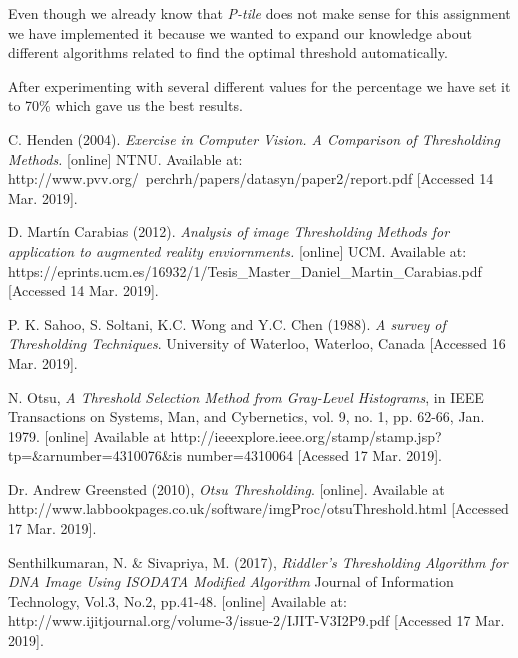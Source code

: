 \documentclass[12]{article}
\begin{document}
Even though we already know that \textit{P-tile} does not make sense for this assignment we have implemented it because we wanted to expand our knowledge about different algorithms related to find the optimal threshold automatically. 

After experimenting with several different values for the percentage we have set it to 70\% which gave us the best results. 


\begin{thebibliography}{100}

C. Henden (2004). \textit{ Exercise in Computer Vision. A Comparison of Thresholding Methods.} [online] NTNU. Available at: http://www.pvv.org/~perchrh/papers/datasyn/paper2/report.pdf [Accessed 14 Mar. 2019].


D. Martín Carabias (2012). \textit{Analysis of image Thresholding Methods for application to augmented reality enviornments.} [online] UCM. Available at: https://eprints.ucm.es/16932/1/Tesis\_Master\_Daniel\_Martin\_Carabias.pdf [Accessed 14 Mar. 2019].


P. K. Sahoo, S. Soltani, K.C. Wong and Y.C. Chen (1988). \textit{A survey of Thresholding Techniques}. University of Waterloo, Waterloo, Canada  [Accessed 16 Mar. 2019].

\bibitem{}N. Otsu, \textit{A Threshold Selection Method from Gray-Level Histograms}, in IEEE Transactions on Systems, Man, and Cybernetics, vol. 9, no. 1, pp. 62-66, Jan. 1979.
[online] Available at http://ieeexplore.ieee.org/stamp/stamp.jsp?tp=\&arnumber=4310076\&is
number=4310064 [Acessed 17 Mar. 2019].

\bibitem{}Dr. Andrew Greensted (2010), \textit{Otsu Thresholding}. [online]. Available at http://www.labbookpages.co.uk/software/imgProc/otsuThreshold.html [Accessed 17 Mar. 2019].

\bibitem{}Senthilkumaran,  N.  \&  Sivapriya,  M.  (2017),  \textit{Riddler's  Thresholding Algorithm  for  DNA  Image  Using  ISODATA  Modified  Algorithm} Journal  of Information Technology, Vol.3, No.2, pp.41-48. [online] Available at: http://www.ijitjournal.org/volume-3/issue-2/IJIT-V3I2P9.pdf [Accessed 17 Mar. 2019].

\end{thebibliography}
\end{document}
